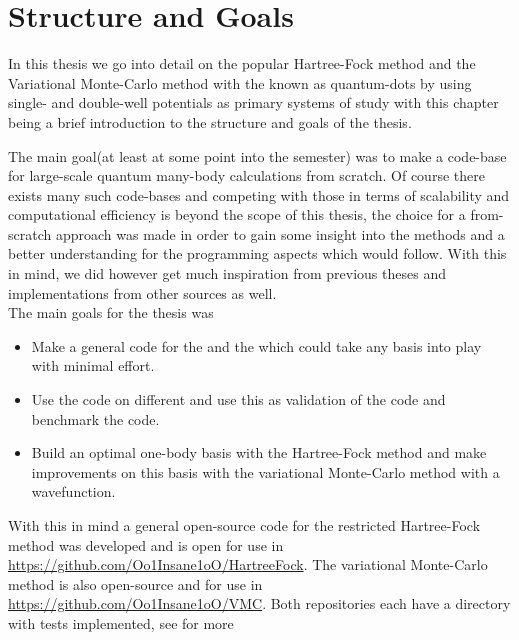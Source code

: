 \section{Structure and Goals\label{sec:structure_and_goals}}
    In this thesis we go into detail on the popular Hartree-Fock method and the
    Variational Monte-Carlo method with the  known as
    quantum-dots by using single- and double-well potentials as primary systems
    of study with this chapter being a brief introduction to the structure and
    goals of the thesis.

    The main goal(at least at some point into the semester) was to make a
    code-base for large-scale quantum many-body calculations from scratch. Of
    course there exists many such code-bases and competing with those in terms
    of scalability and computational efficiency is beyond the scope of this
    thesis, the choice for a from-scratch approach was made in order to gain
    some insight into the methods and a better understanding for the
    programming aspects which would follow. With this in mind, we did however
    get much inspiration from previous theses and implementations from other
    sources as well. \\
    The main goals for the thesis was
        \begin{itemize}
            \item Make a general \CC code for the 
                and the  which could take
                any basis into play with minimal effort.
            \item Use the \CC code on different  and use this as validation of the code and
                benchmark the code.
            \item Build an optimal one-body basis with the Hartree-Fock method
                and make improvements on this basis with the variational
                Monte-Carlo method with a  wavefunction.
        \end{itemize}
    With this in mind a general open-source code for the restricted
    Hartree-Fock method was developed and is open for use in
    \url{https://github.com/Oo1Insane1oO/HartreeFock}. The variational
    Monte-Carlo method is also open-source and for use in
    \url{https://github.com/Oo1Insane1oO/VMC}. Both repositories each have a
    directory with tests implemented, see  for more
